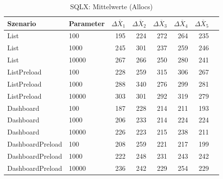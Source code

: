 
\begin{table}[ht]
\setlength{\extrarowheight}{-1pt}
\centering
\caption{SQLX: Mittelwerte (Allocs)}
\begin{tabular}{llrrrrrr}
\toprule
Szenario & Parameter & ${\Delta \overline{X}_1}$ & ${\Delta \overline{X}_2}$ & ${\Delta \overline{X}_3}$ & ${\Delta \overline{X}_4}$ & ${\Delta \overline{X}_5}$ \\
\midrule
	List & 100 & 195 & 224 & 272 & 264 & 235 \\
	List & 1000 & 245 & 301 & 237 & 259 & 246 \\
	List & 10000 & 267 & 266 & 250 & 280 & 241 \\
	ListPreload & 100 & 228 & 259 & 315 & 306 & 267 \\
	ListPreload & 1000 & 288 & 340 & 276 & 299 & 281 \\
	ListPreload & 10000 & 303 & 301 & 292 & 319 & 279 \\
	Dashboard & 100 & 187 & 228 & 214 & 211 & 193 \\
	Dashboard & 1000 & 206 & 233 & 214 & 224 & 224 \\
	Dashboard & 10000 & 226 & 223 & 215 & 238 & 211 \\
	DashboardPreload & 100 & 208 & 259 & 221 & 217 & 199 \\
	DashboardPreload & 1000 & 222 & 248 & 231 & 243 & 242 \\
	DashboardPreload & 10000 & 236 & 242 & 229 & 254 & 229 \\
\bottomrule
\end{tabular}
\label{tab:mittelwerte_sqlx_allocs}
\end{table}
	